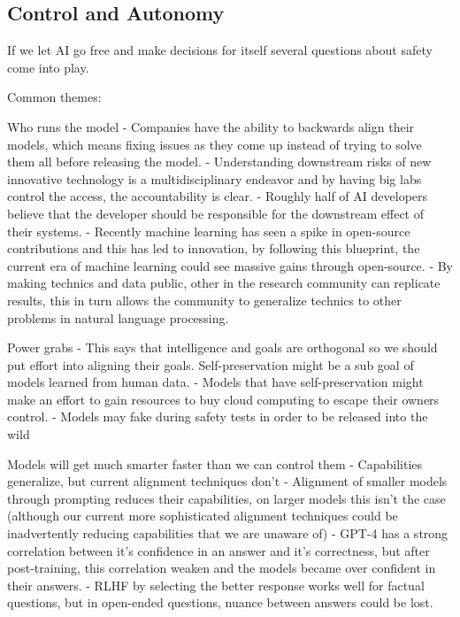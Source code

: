 \subsection{Control and Autonomy}

If we let AI go free and make decisions for itself several questions about safety come into play.

Common themes:

Who runs the model
\citep{ji_ai_2023} - Companies have the ability to backwards align their models, which means fixing issues as they come up instead of trying to solve them all before releasing the model.
\citep{solaiman_gradient_2023} - Understanding downstream risks of new innovative technology is a multidisciplinary endeavor and by having big labs control the access, the accountability is clear.
\citep{michael_what_2022} - Roughly half of AI developers believe that the developer should be responsible for the downstream effect of their systems.
\citep{eiras_near_2024} - Recently machine learning has seen a spike in open-source contributions and this has led to innovation, by following this blueprint, the current era of machine learning could see massive gains through open-source.
\citep{manchanda_open_2025} - By making technics and data public, other in the research community can replicate results, this in turn allows the community to generalize technics to other problems in natural language processing.

Power grabs
\citep{bostrom_superintelligent_2012} - This says that intelligence and goals are orthogonal so we should put effort into aligning their goals. Self-preservation might be a sub goal of models learned from human data.
\citep{shevlane_model_2023} - Models that have self-preservation might make an effort to gain resources to buy cloud computing to escape their owners control.
\citep{carlsmith_scheming_2023} - Models may fake during safety tests in order to be released into the wild

Models will get much smarter faster than we can control them
\citep{soares_central_2022} - Capabilities generalize, but current alignment techniques don't
\citep{askell_general_2021} - Alignment of smaller models through prompting reduces their capabilities, on larger models this isn't the case (although our current more sophisticated alignment techniques could be inadvertently reducing capabilities that we are unaware of)
\citep{openai_gpt_4_2023} - GPT-4 has a strong correlation between it's confidence in an answer and it's correctness, but after post-training, this correlation weaken and the models became over confident in their answers.
\citep{song_reward_2023} - RLHF by selecting the better response works well for factual questions, but in open-ended questions, nuance between answers could be lost.

